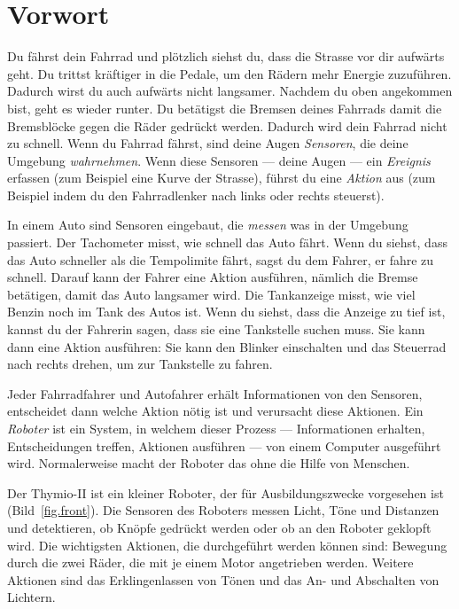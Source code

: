 \chapter*{Vorwort}


Du fährst dein Fahrrad und plötzlich siehst du, dass die Strasse vor dir
aufwärts geht.  Du trittst kräftiger in die Pedale, um den Rädern mehr Energie
zuzuführen. Dadurch wirst du auch aufwärts nicht langsamer. Nachdem du oben
angekommen bist, geht es wieder runter. Du betätigst die Bremsen deines
Fahrrads damit die Bremsblöcke gegen die Räder gedrückt werden. Dadurch wird
dein Fahrrad nicht zu schnell.  Wenn du Fahrrad fährst, sind deine Augen
\emph{Sensoren}, die deine Umgebung \emph{wahrnehmen}. Wenn diese Sensoren ---
deine Augen --- ein \emph{Ereignis} erfassen (zum Beispiel eine Kurve der
Strasse), führst du eine \emph{Aktion} aus (zum Beispiel indem du den
Fahrradlenker nach links oder rechts steuerst).

In einem Auto sind Sensoren eingebaut, die \emph{messen} was in der Umgebung
passiert. Der Tachometer misst, wie schnell das Auto fährt. Wenn du siehst, dass
das Auto schneller als die Tempolimite fährt, sagst du dem Fahrer, er fahre zu
schnell. Darauf kann der Fahrer eine Aktion ausführen, nämlich die Bremse
betätigen, damit das Auto langsamer wird. Die Tankanzeige misst, wie viel Benzin
noch im Tank des Autos ist. Wenn du siehst, dass die Anzeige zu tief ist,
kannst du der Fahrerin sagen, dass sie eine Tankstelle suchen muss. Sie kann
dann eine Aktion ausführen: Sie kann den Blinker einschalten und das Steuerrad
nach rechts drehen, um zur Tankstelle zu fahren.

Jeder Fahrradfahrer und Autofahrer erhält Informationen von den Sensoren,
entscheidet dann welche Aktion nötig ist und verursacht diese Aktionen.
Ein \emph{Roboter} ist ein System, in welchem dieser Prozess --- Informationen
erhalten, Entscheidungen treffen, Aktionen ausführen --- von einem Computer
ausgeführt wird. Normalerweise macht der Roboter das ohne die Hilfe von
Menschen.


Der Thymio-II ist ein kleiner Roboter, der für Ausbildungszwecke vorgesehen ist
(Bild~\ref{fig.front}). Die Sensoren des Roboters messen Licht, Töne und
Distanzen und detektieren, ob Knöpfe gedrückt werden oder ob an den Roboter
geklopft wird. Die wichtigsten Aktionen, die durchgeführt werden können sind: Bewegung durch die zwei Räder, die mit je einem Motor angetrieben werden. Weitere Aktionen sind das Erklingenlassen von Tönen und das An- und Abschalten von Lichtern.

